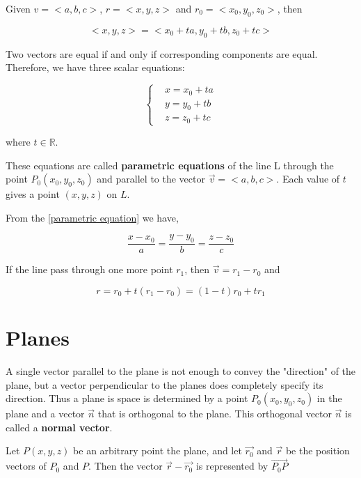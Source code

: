 Given $v = <a, b, c>$, $r=<x, y, z>$ and $r_0=<x_0, y_0, z_0>$, then

\begin{equation}
    <x, y, z> = <x_0 + ta, y_0 + tb, z_0 + tc>
\end{equation}

Two vectors are equal if and only if corresponding components are equal. Therefore, we have three scalar equations:

\begin{equation}
    \label{parametric equation}
  \left\{
    \begin{aligned}
      & x = x_0 + ta\\
      & y = y_0 + tb\\
      & z = z_0 + tc
    \end{aligned}
  \right.
\end{equation}

where $t \in \mathbb{R}$.

These equations are called \textbf{parametric equations} of the line L through the point $P_0(x_0, y_0, z_0)$ and parallel to the vector $\vec{v} = <a, b, c>$. Each value of $t$ gives a point $(x, y, z)$ on $L$.

From the \ref{parametric equation} we have,

\begin{equation}
    \label{symmetric equation}
    \frac{x - x_0}{a} = \frac{y - y_0}{b} = \frac{z - z_0}{c}
\end{equation}

If the line pass through one more point $r_1$, then $\vec{v} = r_1 - r_0$ and

\begin{equation}
    r = r_0 + t(r_1 - r_0) = (1 - t)r_0 + tr_1
\end{equation}


\section{Planes}

A single vector parallel to the plane is not enough to convey the "direction" of the plane, but a vector perpendicular to the planes does completely specify its direction. Thus a plane is space is determined by a point $P_0(x_0, y_0, z_0)$ in the plane and a vector $\vec{n}$ that is orthogonal to the plane. This orthogonal vector $\vec{n}$ is called a \textbf{normal vector}.

Let $P(x, y, z)$ be an arbitrary point the plane, and let $\vec{r_0}$ and $\vec{r}$ be the position vectors of $P_0$ and $P$. Then the vector $\vec{r} - \vec{r_0}$ is represented by $\vec{P_0P}$

